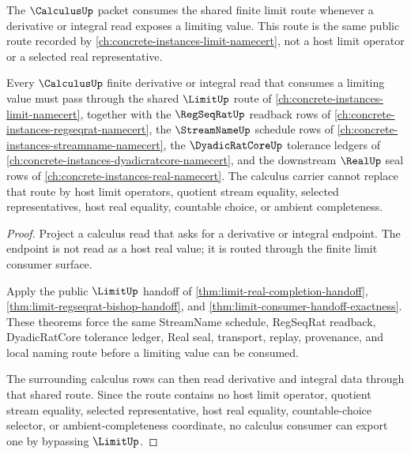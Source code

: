 The $\CalculusUp$ packet consumes the shared finite limit route whenever a derivative or integral read exposes a limiting value. This route is the same public route recorded by \autoref{ch:concrete-instances-limit-namecert}, not a host limit operator or a selected real representative.

\begin{theorem}
\label{thm:calculus-limit-dependency-route}
Every $\CalculusUp$ finite derivative or integral read that consumes a limiting value must pass through the shared $\LimitUp$ route of \autoref{ch:concrete-instances-limit-namecert}, together with the $\RegSeqRatUp$ readback rows of \autoref{ch:concrete-instances-regseqrat-namecert}, the $\StreamNameUp$ schedule rows of \autoref{ch:concrete-instances-streamname-namecert}, the $\DyadicRatCoreUp$ tolerance ledgers of \autoref{ch:concrete-instances-dyadicratcore-namecert}, and the downstream $\RealUp$ seal rows of \autoref{ch:concrete-instances-real-namecert}. The calculus carrier cannot replace that route by host limit operators, quotient stream equality, selected representatives, host real equality, countable choice, or ambient completeness.
\end{theorem}
\begin{proof}
Project a calculus read that asks for a derivative or integral endpoint. The endpoint is not read as a host real value; it is routed through the finite limit consumer surface.

Apply the public $\LimitUp$ handoff of \autoref{thm:limit-real-completion-handoff}, \autoref{thm:limit-regseqrat-bishop-handoff}, and \autoref{thm:limit-consumer-handoff-exactness}. These theorems force the same StreamName schedule, RegSeqRat readback, DyadicRatCore tolerance ledger, Real seal, transport, replay, provenance, and local naming route before a limiting value can be consumed.

The surrounding calculus rows can then read derivative and integral data through that shared route. Since the route contains no host limit operator, quotient stream equality, selected representative, host real equality, countable-choice selector, or ambient-completeness coordinate, no calculus consumer can export one by bypassing $\LimitUp$.
\end{proof}

